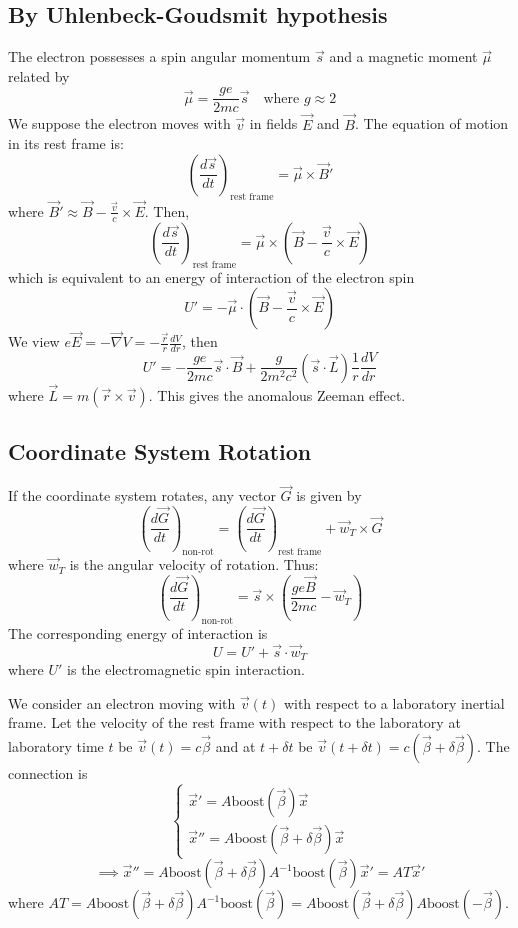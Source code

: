 \documentclass{article}
\begin{document}
	\subsection*{By Uhlenbeck-Goudsmit hypothesis}
	The electron possesses a spin angular momentum $\vec{s}$ and a magnetic moment $\vec{\mu}$ related by
	$$ \vec{\mu} = \frac{g e}{2mc} \vec{s} \quad \text{where } g \approx 2 $$
	We suppose the electron moves with $\vec{v}$ in fields $\vec{E}$ and $\vec{B}$.
	The equation of motion in its rest frame is:
	$$ \left( \frac{d\vec{s}}{dt} \right)_{\text{rest frame}} = \vec{\mu} \times \vec{B}' $$
	where $\vec{B}' \approx \vec{B} - \frac{\vec{v}}{c} \times \vec{E}$.
	Then,
	$$ \left( \frac{d\vec{s}}{dt} \right)_{\text{rest frame}} = \vec{\mu} \times \left( \vec{B} - \frac{\vec{v}}{c} \times \vec{E} \right) $$
	which is equivalent to an energy of interaction of the electron spin
	$$ U' = - \vec{\mu} \cdot \left( \vec{B} - \frac{\vec{v}}{c} \times \vec{E} \right) $$
	We view $e\vec{E} = - \vec{\nabla} V = -\frac{\vec{r}}{r}\frac{dV}{dr}$, then
	$$ U' = -\frac{ge}{2mc} \vec{s} \cdot \vec{B} + \frac{g}{2m^2c^2} (\vec{s} \cdot \vec{L}) \frac{1}{r} \frac{dV}{dr} $$
	where $\vec{L} = m(\vec{r} \times \vec{v})$.
	This gives the anomalous Zeeman effect.
	
	\subsection*{Coordinate System Rotation}
	If the coordinate system rotates, any vector $\vec{G}$ is given by
	$$ \left( \frac{d\vec{G}}{dt} \right)_{\text{non-rot}} = \left( \frac{d\vec{G}}{dt} \right)_{\text{rest frame}} + \vec{w}_T \times \vec{G} $$
	where $\vec{w}_T$ is the angular velocity of rotation.
	Thus:
	$$ \left( \frac{d\vec{G}}{dt} \right)_{\text{non-rot}} = \vec{s} \times \left( \frac{ge\vec{B}}{2mc} - \vec{w}_T \right) $$
	The corresponding energy of interaction is
	$$ U = U' + \vec{s} \cdot \vec{w}_T $$
	where $U'$ is the electromagnetic spin interaction.
	
	We consider an electron moving with $\vec{v}(t)$ with respect to a laboratory inertial frame. Let the velocity of the rest frame with respect to the laboratory at laboratory time $t$ be $\vec{v}(t)=c\vec{\beta}$ and at $t+\delta t$ be $\vec{v}(t+\delta t)=c(\vec{\beta}+\delta\vec{\beta})$.
	The connection is
	$$ \begin{cases} \vec{x}' = A \text{boost}(\vec{\beta}) \vec{x} \\ \vec{x}'' = A \text{boost}(\vec{\beta}+\delta\vec{\beta}) \vec{x} \end{cases} $$
	$$ \implies \vec{x}'' = A \text{boost}(\vec{\beta}+\delta\vec{\beta}) A^{-1} \text{boost}(\vec{\beta}) \vec{x}' = AT \vec{x}' $$
	where $AT = A \text{boost}(\vec{\beta}+\delta\vec{\beta}) A^{-1} \text{boost}(\vec{\beta}) = A \text{boost}(\vec{\beta}+\delta\vec{\beta}) A \text{boost}(-\vec{\beta})$.
	
\end{document}
